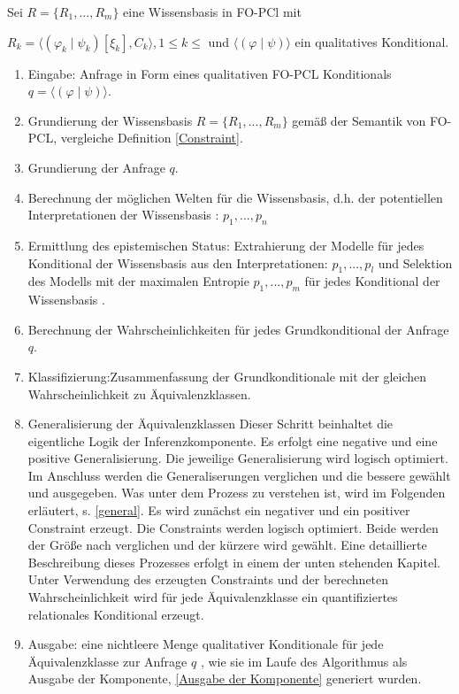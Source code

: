\documentclass[a4paper, 11pt]{book}
\begin{document}
\newpage

Sei $ R = \{R_1, ..., R_m\} $ eine Wissensbasis in FO-PCl mit

$ R_k =  \langle(\varphi_k \mid \psi_k)[\xi_k], C_k \rangle , 1 \leq k \leq  $ und $ \langle (\varphi \mid \psi) \rangle $ ein qualitatives Konditional.
\begin{enumerate}
	\item Eingabe: Anfrage in Form eines qualitativen FO-PCL Konditionals\\
	$ q = \langle (\varphi \mid \psi) \rangle $.
	\item Grundierung der Wissensbasis $ R = \{R_1, ..., R_m\} $ gemäß der Semantik von FO-PCL, vergleiche Definition \ref{Constraint}.
	\item Grundierung der Anfrage $ q $.
	\item Berechnung der möglichen Welten für die Wissensbasis, d.h. der potentiellen Interpretationen der Wissensbasis : $ p_1, ..., p_n $
	\item Ermittlung des epistemischen Status: Extrahierung der Modelle für jedes Konditional der Wissensbasis aus den Interpretationen: $ p_1, ..., p_l $ und Selektion des Modells mit der maximalen Entropie $p_1, ..., p_m$ für jedes Konditional der Wissensbasis .
	\item Berechnung der Wahrscheinlichkeiten für jedes Grundkonditional der Anfrage $ q $.
	\item Klassifizierung:Zusammenfassung der Grundkonditionale mit der gleichen Wahrscheinlichkeit zu Äquivalenzklassen. 

	\item Generalisierung der Äquivalenzklassen 
	Dieser Schritt beinhaltet die eigentliche Logik der Inferenzkomponente.
	Es erfolgt eine negative und eine positive Generalisierung. Die jeweilige Generalisierung wird logisch optimiert. Im Anschluss werden die Generaliserungen verglichen und die bessere gewählt und ausgegeben. Was unter dem Prozess zu verstehen ist, wird im Folgenden erläutert, s. \ref{general}. 
	Es wird zunächst ein negativer und ein positiver Constraint erzeugt. Die Constraints werden logisch optimiert. Beide werden der Größe nach verglichen und der kürzere wird gewählt. Eine detaillierte Beschreibung dieses Prozesses erfolgt in einem der unten stehenden Kapitel.
	Unter Verwendung des erzeugten Constraints und der berechneten Wahrscheinlichkeit wird für jede Äquivalenzklasse ein quantifiziertes relationales Konditional erzeugt.
	
	\item Ausgabe: eine nichtleere Menge qualitativer Konditionale für jede Äquivalenzklasse zur Anfrage $ q $ , wie sie im Laufe des Algorithmus als Ausgabe der Komponente, \ref{Ausgabe der Komponente} generiert wurden.
	
	
	
\end{enumerate}
\end{document}

